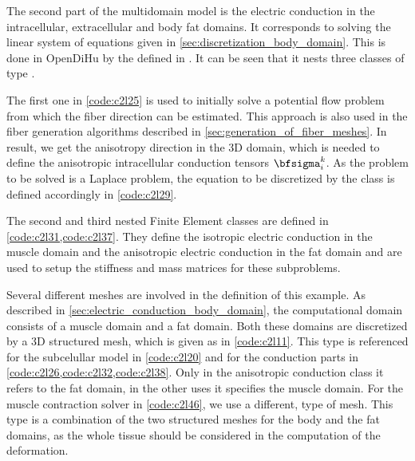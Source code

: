 The second part of the multidomain model is the electric conduction in the intracellular, extracellular and body fat domains. It corresponds to solving the linear system of equations given in \cref{sec:discretization_body_domain}. This is done in OpenDiHu by the  defined in . It can be seen that it nests three classes of type . 

The first one in \cref{code:c2l25} is used to initially solve a potential flow problem from which the fiber direction can be estimated. This approach \cite{Choi2013} is also used in the fiber generation algorithms described in \cref{sec:generation_of_fiber_meshes}. In result, we get the anisotropy direction in the 3D domain, which is needed to define the anisotropic intracellular conduction tensors $\bfsigma_i^k$. As the problem to be solved is a Laplace problem, the equation to be discretized by the class is defined accordingly in \cref{code:c2l29}.

The second and third nested Finite Element classes are defined in \cref{code:c2l31,code:c2l37}. They define the isotropic electric conduction in the muscle domain and the anisotropic electric conduction in the fat domain and are used to setup the stiffness and mass matrices for these subproblems.

Several different meshes are involved in the definition of this example. As described in \cref{sec:electric_conduction_body_domain}, the computational domain consists of a muscle domain and a fat domain. Both these domains are discretized by a 3D structured mesh, which is given as  in \cref{code:c2l11}. This type is referenced for the subcelullar model in \cref{code:c2l20} and for the conduction parts in \cref{code:c2l26,code:c2l32,code:c2l38}. Only in the anisotropic conduction class it refers to the fat domain, in the other uses it specifies the muscle domain.
For the muscle contraction solver in \cref{code:c2l46}, we use a different,  type of mesh. This type is a combination of the two structured meshes for the body and the fat domains, as the whole tissue should be considered in the computation of the deformation.

